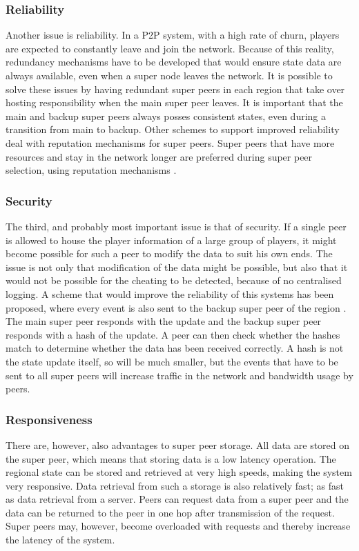 \documentclass[10pt,a4paper,journal,cspaper,compsoc]{IEEEtran}
\begin{document}
\subsubsection{Reliability}
Another issue is reliability. In a P2P system, with a high rate of churn, players are expected to constantly leave and join the network. Because of
this reality, redundancy mechanisms have to be developed that would ensure state data are always available, even when a super node leaves the
network. It is possible to solve these issues by having redundant super peers in each region that take over hosting responsibility when the main
super peer leaves. It is important that the main and backup super peers always posses consistent states, even during a transition from main to
backup. Other schemes to support improved reliability deal with reputation mechanisms for super peers. Super peers that have more resources and stay
in the network longer are preferred during super peer selection, using reputation mechanisms \cite{fan_mediator_paper}.

\subsubsection{Security}
The third, and probably most important issue is that of security. If a single peer is allowed to house the player information of a large group of
players, it might become possible for such a peer to modify the data to suit his own ends. The issue is not only that modification of the data might
be possible, but also that it would not be possible for the cheating to be detected, because of no centralised logging. A scheme that would improve
the reliability of this systems has been proposed, where every event is also sent to the backup super peer of the region \cite{past_storage_focus}.
The main super peer responds with the update and the backup super peer responds with a hash of the update. A peer can then check whether the hashes
match to determine whether the data has been received correctly. A hash is not the state update itself, so will be much smaller, but the events that
have to be sent to all super peers will increase traffic in the network and bandwidth usage by peers.

\subsubsection{Responsiveness}
There are, however, also advantages to super peer storage. All data are stored on the super peer, which means that storing data is a low latency
operation. The regional state can be stored and retrieved at very high speeds, making the system very responsive. Data retrieval from such a storage
is also relatively fast; as fast as data retrieval from a server. Peers can request data from a super peer and the data can be returned to the peer
in one hop after transmission of the request. Super peers may, however, become overloaded with requests and thereby increase the latency of the
system.
\end{document}
